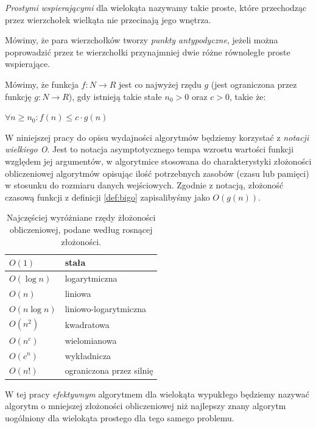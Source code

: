 \begin{definicja}
  \emph{Prostymi wspierającymi} dla wielokąta nazywamy takie proste,
  które przechodząc przez wierzchołek wielkąta nie przecinają jego
  wnętrza.
\end{definicja}

\begin{definicja}
  Mówimy, że para wierzchołków tworzy \emph{punkty antypodyczne},
  jeżeli można poprowadzić przez te wierzchołki przynajmniej dwie
  różne równoległe proste wspierające.
\end{definicja}

\begin{definicja}\label{def:bigo}
  Mówimy, że funkcja $f\colon N \to R$ jest co najwyżej rzędu $g$
  (jest ograniczona przez funkcję $g\colon N \to R$), gdy istnieją
  takie stałe $n_0 > 0$ oraz $c > 0$, takie że:

  \begin{center}
    $\forall n \geq n_0 : f(n) \leq c \cdot g(n)$
  \end{center}
\end{definicja}

W niniejszej pracy do opisu wydajności algorytmów będziemy korzystać
z \emph{notacji wielkiego O}. Jest to notacja asymptotycznego tempa
wzrostu wartości funkcji względem jej argumentów, w algorytmice
stosowana do charakterystyki złożoności obliczeniowej algorytmów
opisując ilość potrzebnych zasobów (czasu lub pamięci) w stosunku
do rozmiaru danych wejściowych. Zgodnie z notacją, złożoność czasową
funkcji z definicji \ref{def:bigo} zapisalibyśmy jako $O(g(n))$.

\begin{table}[htb]
  \centering

  \begin{tabular}{ll}
    \toprule
    $O(1)$ & stała \\
    \midrule
    $O(\log n)$ & logarytmiczna \\
    \midrule
    $O(n)$ & liniowa \\
    \midrule
    $O(n \log n)$ & liniowo-logarytmiczna \\
    \midrule
    $O(n^2)$ & kwadratowa \\
    \midrule
    $O(n^c)$ & wielomianowa \\
    \midrule
    $O(c^n)$ & wykładnicza \\
    \midrule
    $O(n!)$ & ograniczona przez silnię \\
    \bottomrule
  \end{tabular}

  \caption{Najczęściej wyróżniane rzędy żłożoności obliczeniowej,
    podane według rosnącej złożoności.}
\end{table}

W tej pracy \emph{efektywnym} algorytmem dla wielokąta wypukłego będziemy
nazywać algorytm o mniejszej złożoności obliczeniowej niż najlepszy
znany algorytm uogólniony dla wielokąta prostego dla tego samego
problemu.


